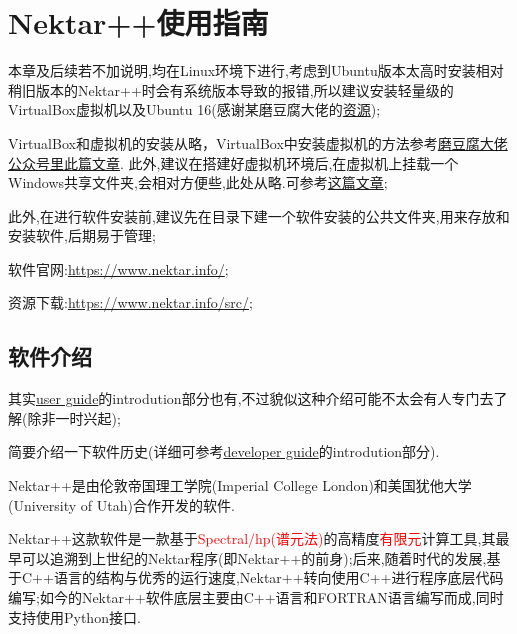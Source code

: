 \chapter{Nektar++使用指南}
本章及后续若不加说明,均在Linux环境下进行,考虑到Ubuntu版本太高时安装相对稍旧版本的Nektar++时会有系统版本导致的报错,所以建议安装轻量级的VirtualBox虚拟机以及Ubuntu 16(感谢某磨豆腐大佬的\href{https://pan.baidu.com/s/1myh95ppKbdD39LbbPHqViA?pwd=1024}{资源});\par

VirtualBox和虚拟机的安装从略，VirtualBox中安装虚拟机的方法参考\href{https://mp.weixin.qq.com/s/_EpV4nraUeiVdLHgsxxBFg}{磨豆腐大佬公众号里此篇文章}.
此外,建议在搭建好虚拟机环境后,在虚拟机上挂载一个Windows共享文件夹,会相对方便些,此处从略.可参考\href{https://zhuanlan.zhihu.com/p/389629976?utm_source=wechat_session&utm_medium=social&s_r=0}{这篇文章};\par

此外,在进行软件安装前,建议先在目录下建一个软件安装的公共文件夹,用来存放和安装软件,后期易于管理;\par

软件官网:\url{https://www.nektar.info/};\par
资源下载:\url{https://www.nektar.info/src/};


\section{软件介绍}
其实\href{https://www.nektar.info/src/user-guide-5.0.1.pdf}{user guide}的introdution部分也有,不过貌似这种介绍可能不太会有人专门去了解(除非一时兴起);\par

简要介绍一下软件历史(详细可参考\href{https://www.nektar.info/src/developer-guide-5.0.1.pdf}{developer guide}的introdution部分).\par
Nektar++是由伦敦帝国理工学院(Imperial College London)和美国犹他大学(University of Utah)合作开发的软件.\par
Nektar++这款软件是一款基于\textcolor{red}{Spectral/hp(谱元法)}的高精度\textcolor{red}{有限元}计算工具,其最早可以追溯到上世纪的Nektar程序(即Nektar++的前身);后来,随着时代的发展,基于C++语言的结构与优秀的运行速度,Nektar++转向使用C++进行程序底层代码编写;如今的Nektar++软件底层主要由C++语言和FORTRAN语言编写而成,同时支持使用Python接口.

